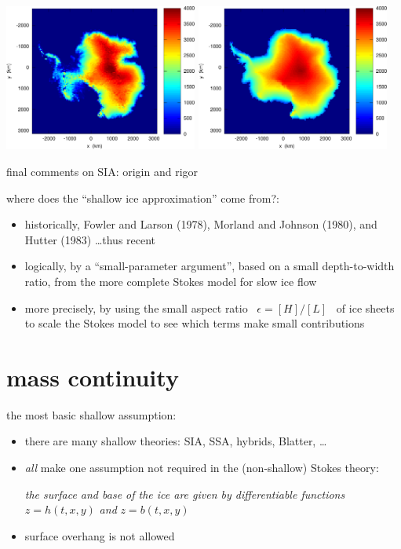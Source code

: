 \documentclass[titlepage,letterpaper,final,11pt]{scrartcl}
\newcommand{\eps}{\epsilon}
\begin{document}
\includegraphics[width=2.5in]{antinitial}
\quad
\includegraphics[width=2.5in]{antfinal}

final comments on SIA: origin and rigor

where does the ``shallow ice approximation'' come from?:

\begin{itemize}
\item historically, Fowler and Larson (1978)\nocite{FowlerLarson1978}, Morland and Johnson (1980)\nocite{MorlandJohnson}, and Hutter (1983)\nocite{Hutter} \dots thus recent
\item logically, by a ``small-parameter argument'', based on a small depth-to-width ratio, from the more complete Stokes model for slow ice flow
\item more precisely, by using the small aspect ratio \, $\eps = [H]/[L]$ \, of ice sheets to scale the Stokes model to see which terms make small contributions
\end{itemize}



\section{mass continuity}

the most basic shallow assumption:

\begin{itemize}
\item there are many shallow theories: SIA, SSA, hybrids, Blatter, \dots \nocite{Blatter}
\item \emph{all} make one assumption not required in the (non-shallow) Stokes theory:

\begin{center}
\emph{the surface and base of the ice are given by differentiable functions} $z=h(t,x,y)$ \emph{and} $z=b(t,x,y)$
\end{center}
\item surface overhang is not allowed
\end{itemize}
\end{document}
